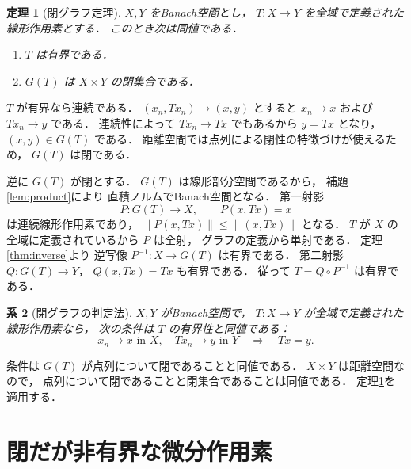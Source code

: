 \documentclass[a5paper,10pt,onecolumn]{jsarticle}
\makeatletter
\theoremstyle{mathnotetheorem}
\newtheorem{theorem}{定理}[section]
\newtheorem{corollary}[theorem]{系}
\renewcommand{\proofname}{証明}
\renewenvironment{proof}[1][\proofname]{%
  \par\pushQED{\qed}\normalfont\topsep4\p@\@plus2\p@\relax
  \trivlist\item[\hskip\labelsep\bfseries #1]\ignorespaces
}{\popQED\endtrivlist\@endpefalse}
\makeatother
\begin{document}
\begin{theorem}[閉グラフ定理]\label{thm:closedgraph}
$X,Y$ をBanach空間とし，
$T:X\to Y$ を全域で定義された線形作用素とする．
このとき次は同値である．
\begin{enumerate}
\item $T$ は有界である．
\item $G(T)$ は $X\times Y$ の閉集合である．
\end{enumerate}
\end{theorem}
\begin{proof}
$T$ が有界なら連続である．
$(x_n,Tx_n)\to(x,y)$ とすると
$x_n\to x$ および $Tx_n\to y$ である．
連続性によって $Tx_n\to Tx$ でもあるから
$y=Tx$ となり，$(x,y)\in G(T)$ である．
距離空間では点列による閉性の特徴づけが使えるため，
$G(T)$ は閉である．

逆に $G(T)$ が閉とする．
$G(T)$ は線形部分空間であるから，
補題\ref{lem:product}により
直積ノルムでBanach空間となる．
第一射影
\[
 P:G(T)\to X,\qquad P(x,Tx)=x
\]
は連続線形作用素であり，
$\|P(x,Tx)\|\le\|(x,Tx)\|$ となる．
$T$ が $X$ の全域に定義されているから $P$ は全射，
グラフの定義から単射である．
定理\ref{thm:inverse}より
逆写像
$P^{-1}:X\to G(T)$ は有界である．
第二射影 $Q:G(T)\to Y$，
$Q(x,Tx)=Tx$ も有界である．
従って
$T=Q\circ P^{-1}$ は有界である．
\end{proof}

\begin{corollary}[閉グラフの判定法]
$X,Y$ がBanach空間で，
$T:X\to Y$ が全域で定義された線形作用素なら，
次の条件は $T$ の有界性と同値である：
\[
 x_n\to x\text{ in }X,\quad
 Tx_n\to y\text{ in }Y
 \quad\Longrightarrow\quad Tx=y.
\]
\end{corollary}
\begin{proof}
条件は $G(T)$ が点列について閉であることと同値である．
$X\times Y$ は距離空間なので，
点列について閉であることと閉集合であることは同値である．
定理\ref{thm:closedgraph}を適用する．
\end{proof}

\section{閉だが非有界な微分作用素}
\end{document}
